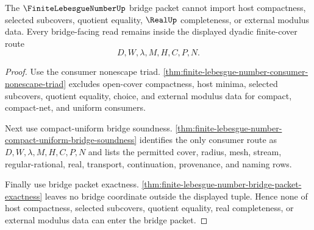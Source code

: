 \begin{theorem}
\label{thm:finite-lebesgue-number-bridge-nonescape}
The $\FiniteLebesgueNumberUp$ bridge packet cannot import host compactness, selected subcovers, quotient equality, $\RealUp$ completeness, or external modulus data. Every bridge-facing read remains inside the displayed dyadic finite-cover route
$$
D,W,\lambda,M,H,C,P,N .
$$
\end{theorem}
\begin{proof}
Use the consumer nonescape triad. \autoref{thm:finite-lebesgue-number-consumer-nonescape-triad} excludes open-cover compactness, host minima, selected subcovers, quotient equality, choice, and external modulus data for compact, compact-net, and uniform consumers.

Next use compact-uniform bridge soundness. \autoref{thm:finite-lebesgue-number-compact-uniform-bridge-soundness} identifies the only consumer route as $D,W,\lambda,M,H,C,P,N$ and lists the permitted cover, radius, mesh, stream, regular-rational, real, transport, continuation, provenance, and naming rows.

Finally use bridge packet exactness. \autoref{thm:finite-lebesgue-number-bridge-packet-exactness} leaves no bridge coordinate outside the displayed tuple. Hence none of host compactness, selected subcovers, quotient equality, real completeness, or external modulus data can enter the bridge packet.
\end{proof}


